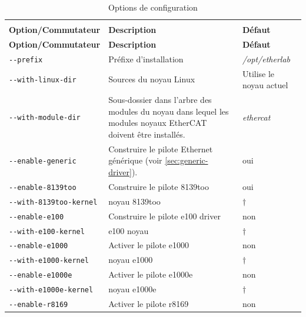 \documentclass[a4paper,12pt,BCOR=6mm,bibtotoc,idxtotoc]{scrbook}
\begin{document}
\begin{longtable}{l|p{}|l}
  \caption{Options de configuration}\rule[-5ex]{0mm}{0mm}
  \label{tab:config}\\

\textbf{Option/Commutateur} & \textbf{Description} &
\textbf{D\'efaut}\\\hline \endfirsthead

\textbf{Option/Commutateur} & \textbf{Description} &
\textbf{D\'efaut}\\\hline \endhead

\lstinline+--prefix+ & Pr\'efixe d'installation &
\textit{/opt/etherlab}\\

\lstinline+--with-linux-dir+ & Sources du noyau Linux & Utilise le
noyau actuel \\

\lstinline+--with-module-dir+ & Sous-dossier dans l'arbre des modules
du noyau dans lequel les modules noyaux EtherCAT doivent \^etre
install\'es.  & \textit{ethercat}\\

\hline

\lstinline+--enable-generic+ & Construire le pilote Ethernet
g\'en\'erique (voir \autoref{sec:generic-driver}). & oui\\

\lstinline+--enable-8139too+ & Construire le pilote 8139too & oui\\

\lstinline+--with-8139too-kernel+ & noyau 8139too & $\dagger$\\

\lstinline+--enable-e100+ & Construire le pilote e100 driver & non\\

\lstinline+--with-e100-kernel+ & e100 noyau & $\dagger$\\

\lstinline+--enable-e1000+ & Activer le pilote e1000 & non\\

\lstinline+--with-e1000-kernel+ & noyau e1000 & $\dagger$\\

\lstinline+--enable-e1000e+ & Activer le pilote e1000e & non\\

\lstinline+--with-e1000e-kernel+ & noyau e1000e & $\dagger$\\

\lstinline+--enable-r8169+ & Activer le pilote r8169 & non\\


\end{longtable}
\end{document}
